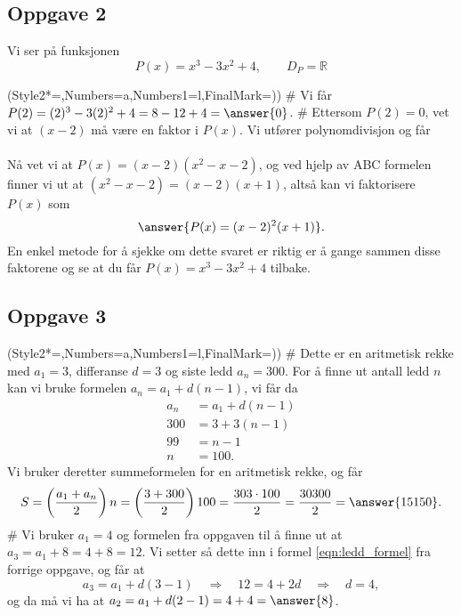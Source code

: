 \subsection*{Oppgave 2}
Vi ser på funksjonen
\begin{equation*}
	P(x) = x^3 - 3x^2 + 4, \qquad D_{P} = \mathbb{R}
\end{equation*}
\begin{easylist}[enumerate]
\ListProperties(Style2*=,Numbers=a,Numbers1=l,FinalMark={)})
# Vi får $P(2) = (2)^3 - 3(2)^2 + 4 = 8 - 12 + 4 = \answer{0}$.
# Ettersom $P(2) = 0$, vet vi at $(x-2)$ må være en faktor i $P(x)$.
Vi utfører polynomdivisjon og får \\
 \\
Nå vet vi at $P(x) = (x-2)(x^2 - x - 2)$, og ved hjelp av 
ABC formelen finner vi ut at $(x^2 - x - 2) = (x-2)(x+1)$,
altså kan vi faktorisere $P(x)$ som
\begin{equation*}
	\answer{P(x) = (x-2)^2 (x+1)}.
\end{equation*}
En enkel metode for å sjekke om dette svaret er riktig er å gange sammen disse faktorene og se at du får $P(x) = x^3 - 3x^2 + 4$ tilbake.

\end{easylist}


\subsection*{Oppgave 3}
\begin{easylist}[enumerate]
	\ListProperties(Style2*=,Numbers=a,Numbers1=l,FinalMark={)})
	# Dette er en aritmetisk rekke med $a_1 = 3$, differanse $d=3$
	og siste ledd $a_n = 300$. For å finne ut antall ledd $n$ kan
	vi bruke formelen $a_n = a_1 + d(n-1)$, vi får da
	\begin{align}
		\label{eqn:ledd_formel}a_n &= a_1 + d(n-1) \\
		\nonumber 300 &= 3 + 3(n-1) \\
		\nonumber 99 &= n-1 \\
		\nonumber n &= 100. 
	\end{align}
	Vi bruker deretter summeformelen for en aritmetisk rekke, og får
	\begin{equation*}
		S = \left(\frac{a_1 + a_n}{2}\right)n 
		= \left(\frac{3 + 300}{2}\right)100
		= \frac{303 \cdot 100}{2} = \frac{30300}{2} = \answer{15150}.
	\end{equation*}
	# Vi bruker $a_1 = 4$ og formelen fra oppgaven til å finne ut at $a_3 = a_1 + 8 = 4 + 8 = 12$.
	Vi setter så dette inn i formel \eqref{eqn:ledd_formel} fra forrige oppgave, og får at 
	\begin{equation*}
		a_3 = a_1 + d(3 -1) \quad \Rightarrow 
		\quad 12 = 4 + 2d   \quad \Rightarrow 
		\quad d = 4,
	\end{equation*}
	og da må vi ha at $a_2 = a_1 + d(2 - 1) = 4 + 4 = \answer{8}$.
\end{easylist}



